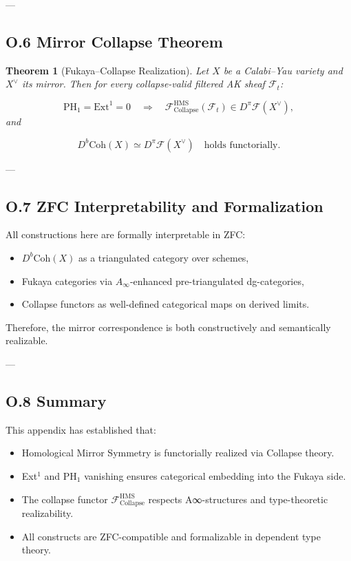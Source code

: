 \documentclass[11pt]{article}
\newtheorem{theorem}{Theorem}[section]
\begin{document}
---

\subsection*{O.6 Mirror Collapse Theorem}

\begin{theorem}[Fukaya–Collapse Realization]
Let $X$ be a Calabi–Yau variety and $X^\vee$ its mirror. Then for every collapse-valid filtered AK sheaf $\mathcal{F}_t$:

\[
\mathrm{PH}_1 = \mathrm{Ext}^1 = 0
\quad \Rightarrow \quad
\mathcal{F}_{\mathrm{Collapse}}^{\mathrm{HMS}}(\mathcal{F}_t) \in D^\pi\mathcal{F}(X^\vee),
\]
and

\[
D^b\mathrm{Coh}(X) \simeq D^\pi\mathcal{F}(X^\vee)
\quad \text{holds functorially}.
\]
\end{theorem}

---

\subsection*{O.7 ZFC Interpretability and Formalization}

All constructions here are formally interpretable in ZFC:

\begin{itemize}
  \item $D^b\mathrm{Coh}(X)$ as a triangulated category over schemes,
  \item Fukaya categories via $A_\infty$-enhanced pre-triangulated dg-categories,
  \item Collapse functors as well-defined categorical maps on derived limits.
\end{itemize}

Therefore, the mirror correspondence is both constructively and semantically realizable.

---

\subsection*{O.8 Summary}

This appendix has established that:

\begin{itemize}
  \item Homological Mirror Symmetry is functorially realized via Collapse theory.
  \item Ext$^1$ and PH$_1$ vanishing ensures categorical embedding into the Fukaya side.
  \item The collapse functor $\mathcal{F}_{\mathrm{Collapse}}^{\mathrm{HMS}}$ respects A∞-structures and type-theoretic realizability.
  \item All constructs are ZFC-compatible and formalizable in dependent type theory.
\end{itemize}
\end{document}
